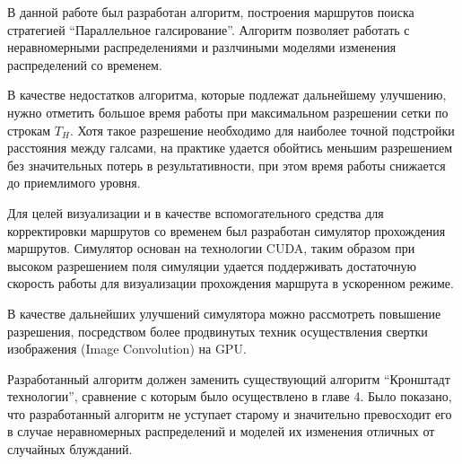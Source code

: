 \startconclusionpage

В данной работе был разработан алгоритм, построения маршрутов поиска стратегией
``Параллельное галсирование''. Алгоритм позволяет работать с неравномерными
распределениями и разлчиными моделями изменения распределений со временем.

В качестве недостатков алгоритма, которые подлежат дальнейшему улучшению,
нужно отметить большое время работы при максимальном разрешении сетки
по строкам $T_H$. Хотя такое разрешение необходимо для наиболее точной
подстройки расстояния между галсами, на практике удается
обойтись меньшим разрешением без значительных потерь в результативности, при
этом время работы снижается до приемлимого уровня.

Для целей визуализации и в качестве вспомогательного средства для корректировки
маршрутов со временем был разработан симулятор прохождения маршрутов.
Симулятор основан на технологии CUDA, таким образом при высоком разрешением
поля симуляции удается поддерживать достаточную скорость работы для
визуализации прохождения маршрута в ускоренном режиме.

В качестве дальнейших улучшений симулятора можно рассмотреть повышение
разрешения, посредством более продвинутых техник осуществления свертки
изображения (Image Convolution) на GPU.

Разработанный алгоритм должен заменить существующий алгоритм
``Кронштадт технологии'', сравнение с которым было осуществлено
в главе 4. Было показано, что разработанный алгоритм не уступает старому и
значительно превосходит его в случае неравномерных распределений и
моделей их изменения отличных от случайных блужданий. 

\FloatBarrier
